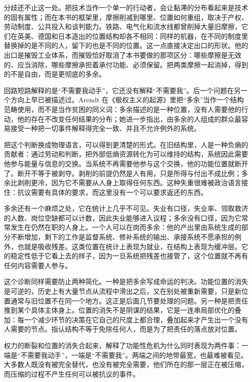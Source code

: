 分歧还不止这一处。把技术当作一个单一的行动者，会让黏滞的分布看起来是技术的固有属性；而在本书的框架里，摩擦削减到哪里、位置如何重组，取决于产权、劳动制度、公共投入和谈判能力。铁路、电气化和流水线都曾削掉大量旧摩擦，它们在英美、德国和日本造出的位置结构却各不相同：同样的机器，在不同的制度里替换掉的是不同的人，留下的也是不同的位置。这一点直接决定出口的形状。他的出口是摧毁工业体系，而摧毁恰好取消了本书要做的那项区分：哪些摩擦是无效的、应当消除，哪些摩擦承担着承付功能、必须保留。把两类摩擦一起消掉，得到的不是自由，而是更彻底的多余。


回路短路解释的是“不需要我动手”，它还没有解释“不需要我”。后一个问题在另一个方向上早已被描述过。Arendt 在《极权主义的起源》里把“多余”当作一个结构范畴使用，而不是当作贫困的同义词：多余描述的是一种位置，没有人需要他的行动，他的存在不改变任何结果的分布；她进一步指出，由多余的人组成的群众最容易接受一种把一切事件解释得完全一致、并且不允许例外的系统\cite{arendt1951origins}。

把这个判断换成物理语言，可以得到更清楚的形式。在旧结构里，人是一种负熵的贡献者：通过劳动和判断，把外部低熵资源转化为可以维持的结构，系统因此需要他参与能量与信息的交换。当系统不再需要他参与这个交换，他的功能位置就断开了。断开不等于被剥夺。剥削的前提仍然是人有用，只是所得与付出不成比例；多余比剥削更冷，因为它不需要从人身上取得任何东西。这种失重很难被政治语言接住：抗议需要有具体的要求，而这里没有一个可以要求返还的东西。

多余还有一个麻烦之处，它在统计上几乎不可见。失业有口径，失业率、领取救济的人数、岗位空缺都可以计数，因此失业能够进入议程；多余没有口径，因为它常常发生在仍然在职的人身上。一个人可以在岗而多余：他的产出里由系统生成的部分不断增加，剩下的工作是监督系统、修补系统的输出、承接系统不愿承担的例外，也就是吸收残差。这类位置在统计上表现为就业，在结构上表现为缓冲层。它的稳定性低于它看上去的样子，因为一旦系统把残差也接管了，这个位置就不再有任何内容需要人参与。

这个诊断同样需要防止两种简化。一种是把多余写成命运的判决。功能位置的消失是可逆的，历史上有大量节点从流程中滑出之后，又在别处被重新需要，只是新位置通常与旧位置不在同一个地方。这正是后面几节要处理的问题。另一种是把责任推到某个具体主体身上。位置的消失不是阴谋的结果，它是一连串局部优化的叠加：每一个减少环节的决策在它自己的尺度上都合理，叠加起来才产生出一个没有人需要的节点。指认结构不等于免除任何人，而是为了把责任的落点放对位置。

权力的断裂和位置的消失合起来，解释了功能性危机为什么同时表现为两件事：一端是“不需要我动手”，一端是“不需要我”。两端之间的地带最宽，也最难被看见。大多数人既没有被完全替代，也没有被完全需要，他们所在的那一层正在被压缩，而压缩的过程不产生任何可以被抗议的事件。

